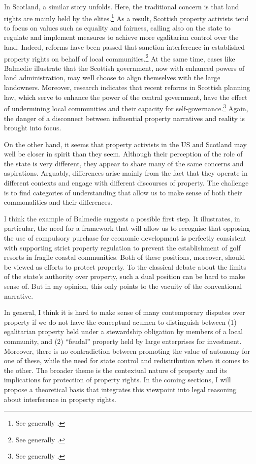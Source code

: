In Scotland, a similar story unfolds. Here, the traditional concern is that land rights are mainly held by the elites.\footnote{See generally \cite{wightman96,wightman13}.} As a result, Scottish property activists tend to focus on values such as equality and fairness, calling also on the state to regulate and implement measures to achieve more egalitarian control over the land. Indeed, reforms have been passed that sanction interference in established property rights on behalf of local communities.\footnote{See generally \cite{lovett11,hoffman13}.} At the same time, cases like Balmedie illustrate that the Scottish government, now with enhanced powers of land administration, may well choose to align themselves with the large landowners. Moreover, research indicates that recent reforms in Scottish planning law, which serve to enhance the power of the central government, have the effect of undermining local communities and their capacity for self-governance.\footnote{See generally \cite{pacione13,pacione14}.} Again, the danger of a disconnect between influential property narratives and reality is brought into focus.

On the other hand, it seems that  property activists in the US and Scotland may well be closer in spirit than they seem. Although their perception of the role of the state is very different, they appear to share many of the same concerns and aspirations. Arguably, differences arise mainly from the fact that they operate in different contexts and engage with different discourses of property. The challenge is to find categories of understanding that allow us to make sense of both their commonalities and their differences.

I think the example of Balmedie suggests a possible first step. It illustrates, in particular, the need for a framework that will allow us to recognise that opposing the use of compulsory purchase for economic development is perfectly consistent with supporting strict property regulation to prevent the establishment of golf resorts in fragile coastal communities. Both of these positions, moreover, should be viewed as efforts to protect property. To the classical debate about the limits of the state's authority over property, such a dual position can be hard to make sense of. But in my opinion, this only points to the vacuity of the conventional narrative.

In general, I think it is hard to make sense of many contemporary disputes over property if we do not have the conceptual acumen to distinguish between (1) egalitarian property held under a stewardship obligation by members of a local community, and (2) ``feudal'' property held by large enterprises for investment. Moreover, there is no contradiction between promoting the value of autonomy for one of these, while  the need for state control and redistribution when it comes to the other. The broader theme is the contextual nature of property and its implications for protection of property rights. In the coming sections, I will propose a theoretical basis that integrates this viewpoint into legal reasoning about interference in property rights.


